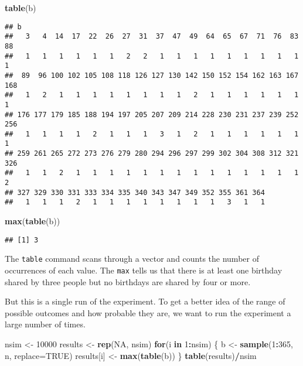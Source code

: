 \documentclass[]{book}
\newenvironment{Shaded}{\begin{snugshade}}{\end{snugshade}}
\newcommand{\ControlFlowTok}[1]{\textcolor[rgb]{0.13,0.29,0.53}{\textbf{#1}}}
\newcommand{\DataTypeTok}[1]{\textcolor[rgb]{0.13,0.29,0.53}{#1}}
\newcommand{\DecValTok}[1]{\textcolor[rgb]{0.00,0.00,0.81}{#1}}
\newcommand{\KeywordTok}[1]{\textcolor[rgb]{0.13,0.29,0.53}{\textbf{#1}}}
\newcommand{\NormalTok}[1]{#1}
\newcommand{\OperatorTok}[1]{\textcolor[rgb]{0.81,0.36,0.00}{\textbf{#1}}}
\newcommand{\OtherTok}[1]{\textcolor[rgb]{0.56,0.35,0.01}{#1}}
\newcommand{\StringTok}[1]{\textcolor[rgb]{0.31,0.60,0.02}{#1}}
\theoremstyle{definition}
\theoremstyle{definition}
\theoremstyle{definition}
\theoremstyle{remark}
\begin{document}
\begin{Shaded}
\begin{Highlighting}[]
\KeywordTok{table}\NormalTok{(b)}
\end{Highlighting}
\end{Shaded}

\begin{verbatim}
## b
##   3   4  14  17  22  26  27  31  37  47  49  64  65  67  71  76  83  88 
##   1   1   1   1   1   1   2   2   1   1   1   1   1   1   1   1   1   1 
##  89  96 100 102 105 108 118 126 127 130 142 150 152 154 162 163 167 168 
##   1   2   1   1   1   1   1   1   1   1   2   1   1   1   1   1   1   1 
## 176 177 179 185 188 194 197 205 207 209 214 228 230 231 237 239 252 256 
##   1   1   1   1   2   1   1   1   3   1   2   1   1   1   1   1   1   1 
## 259 261 265 272 273 276 279 280 294 296 297 299 302 304 308 312 321 326 
##   1   1   2   1   1   1   1   1   1   1   1   1   1   1   1   1   1   2 
## 327 329 330 331 333 334 335 340 343 347 349 352 355 361 364 
##   1   1   1   2   1   1   1   1   1   1   1   1   3   1   1
\end{verbatim}

\begin{Shaded}
\begin{Highlighting}[]
\KeywordTok{max}\NormalTok{(}\KeywordTok{table}\NormalTok{(b))}
\end{Highlighting}
\end{Shaded}

\begin{verbatim}
## [1] 3
\end{verbatim}

The \texttt{table} command scans through a vector and counts the number
of occurrences of each value. The \texttt{max} tells us that there is at
least one birthday shared by three people but no birthdays are shared by
four or more.

But this is a single run of the experiment. To get a better idea of the
range of possible outcomes and how probable they are, we want to run the
experiment a large number of times.

\begin{Shaded}
\begin{Highlighting}[]
\NormalTok{nsim <-}\StringTok{ }\DecValTok{10000}
\NormalTok{results <-}\StringTok{ }\KeywordTok{rep}\NormalTok{(}\OtherTok{NA}\NormalTok{, nsim)}
\ControlFlowTok{for}\NormalTok{(i }\ControlFlowTok{in} \DecValTok{1}\OperatorTok{:}\NormalTok{nsim) \{}
\NormalTok{  b <-}\StringTok{ }\KeywordTok{sample}\NormalTok{(}\DecValTok{1}\OperatorTok{:}\DecValTok{365}\NormalTok{, n, }\DataTypeTok{replace=}\OtherTok{TRUE}\NormalTok{)}
\NormalTok{  results[i] <-}\StringTok{ }\KeywordTok{max}\NormalTok{(}\KeywordTok{table}\NormalTok{(b))}
\NormalTok{\}}
\KeywordTok{table}\NormalTok{(results)}\OperatorTok{/}\NormalTok{nsim}
\end{Highlighting}
\end{Shaded}
\end{document}
